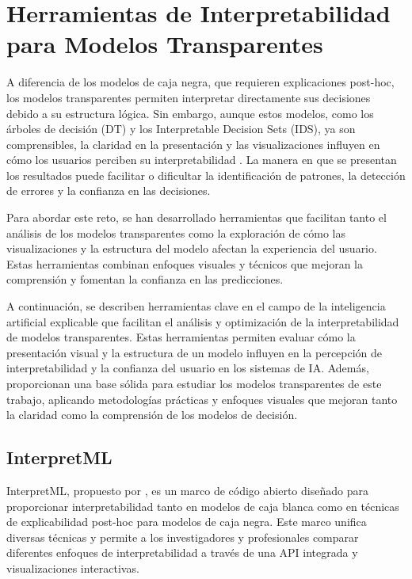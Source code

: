 \section{Herramientas de Interpretabilidad para Modelos Transparentes}

A diferencia de los modelos de caja negra, que requieren explicaciones post-hoc, los modelos transparentes permiten interpretar directamente sus decisiones debido a su estructura lógica. Sin embargo, aunque estos modelos, como los árboles de decisión (DT) y los Interpretable Decision Sets (IDS), ya son comprensibles, la claridad en la presentación y las visualizaciones influyen en cómo los usuarios perciben su interpretabilidad \cite{curso-xai, Rudin-2019}. La manera en que se presentan los resultados puede facilitar o dificultar la identificación de patrones, la detección de errores y la confianza en las decisiones.

Para abordar este reto, se han desarrollado herramientas que facilitan tanto el análisis de los modelos transparentes como la exploración de cómo las visualizaciones y la estructura del modelo afectan la experiencia del usuario. Estas herramientas combinan enfoques visuales y técnicos que mejoran la comprensión y fomentan la confianza en las predicciones.

A continuación, se describen herramientas clave en el campo de la inteligencia artificial explicable que facilitan el análisis y optimización de la interpretabilidad de modelos transparentes. Estas herramientas permiten evaluar cómo la presentación visual y la estructura de un modelo influyen en la percepción de interpretabilidad y la confianza del usuario en los sistemas de IA. Además, proporcionan una base sólida para estudiar los modelos transparentes de este trabajo, aplicando metodologías prácticas y enfoques visuales que mejoran tanto la claridad como la comprensión de los modelos de decisión.

\subsection{InterpretML}

InterpretML, propuesto por \textcite{nori2019interpretml}, es un marco de código abierto diseñado para proporcionar interpretabilidad tanto en modelos de caja blanca como en técnicas de explicabilidad post-hoc para modelos de caja negra. Este marco unifica diversas técnicas y permite a los investigadores y profesionales comparar diferentes enfoques de interpretabilidad a través de una API integrada y visualizaciones interactivas.


